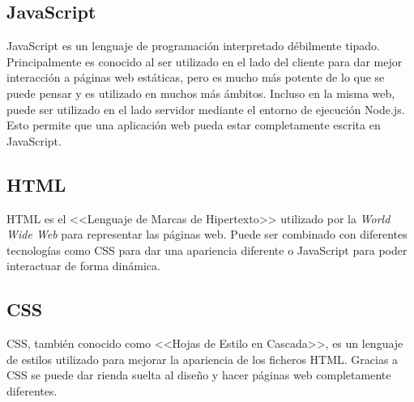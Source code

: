 \subsection{JavaScript}
JavaScript es un lenguaje de programación interpretado débilmente tipado. Principalmente es conocido al ser utilizado en el lado del cliente para dar mejor interacción a páginas web estáticas, pero es mucho más potente de lo que se puede pensar y es utilizado en muchos más ámbitos. Incluso en la misma web, puede ser utilizado en el lado servidor mediante el entorno de ejecución Node.js. Esto permite que una aplicación web pueda estar completamente escrita en JavaScript.\cite{javascript}

\subsection{HTML}
HTML es el <<Lenguaje de Marcas de Hipertexto>> utilizado por la \textit{World Wide Web} para representar las páginas web. Puede ser combinado con diferentes tecnologías como CSS para dar una apariencia diferente o JavaScript para poder interactuar de forma dinámica.

\subsection{CSS}
CSS, también conocido como <<Hojas de Estilo en Cascada>>, es un lenguaje de estilos utilizado para mejorar la apariencia de los ficheros HTML. Gracias a CSS se puede dar rienda suelta al diseño y hacer páginas web completamente diferentes.

